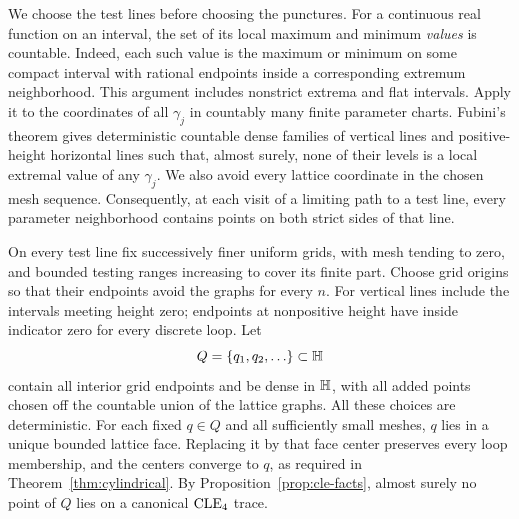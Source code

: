 We choose the test lines before choosing the punctures. For a continuous real function on an interval, the set of its local maximum and minimum \emph{values} is countable. Indeed, each such value is the maximum or minimum on some compact interval with rational endpoints inside a corresponding extremum neighborhood. This argument includes nonstrict extrema and flat intervals. Apply it to the coordinates of all $\gamma_j$ in countably many finite parameter charts. Fubini's theorem gives deterministic countable dense families of vertical lines and positive-height horizontal lines such that, almost surely, none of their levels is a local extremal value of any $\gamma_j$. We also avoid every lattice coordinate in the chosen mesh sequence. Consequently, at each visit of a limiting path to a test line, every parameter neighborhood contains points on both strict sides of that line.

On every test line fix successively finer uniform grids, with mesh tending to zero, and bounded testing ranges increasing to cover its finite part. Choose grid origins so that their endpoints avoid the graphs for every $n$. For vertical lines include the intervals meeting height zero; endpoints at nonpositive height have inside indicator zero for every discrete loop. Let
\[
 Q=\{q_1,q_2,\ldots\}\subset\mathbb H
\]
contain all interior grid endpoints and be dense in $\mathbb H$, with all added points chosen off the countable union of the lattice graphs. All these choices are deterministic. For each fixed $q\in Q$ and all sufficiently small meshes, $q$ lies in a unique bounded lattice face. Replacing it by that face center preserves every loop membership, and the centers converge to $q$, as required in Theorem~\ref{thm:cylindrical}. By Proposition~\ref{prop:cle-facts}, almost surely no point of $Q$ lies on a canonical $\mathrm{CLE}_4$ trace.

